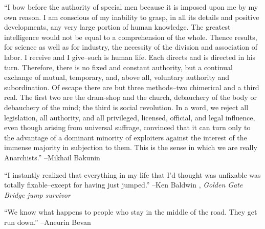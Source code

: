 \documentclass{article}%
\begin{document}
\linebreak%
\vspace{1mm}%
\begin{minipage}{\textwidth}%
\flushleft%
“I bow before the authority of special men because it is imposed upon me by my own reason. I am conscious of my inability to grasp, in all its details and positive developments, any very large portion of human knowledge. The greatest intelligence would not be equal to a comprehension of the whole. Thence results, for science as well as for industry, the necessity of the division and association of labor. I receive and I give–such is human life. Each directs and is directed in his turn. Therefore, there is no fixed and constant authority, but a continual exchange of mutual, temporary, and, above all, voluntary authority and subordination. Of escape there are but three methods–two chimerical and a third real. The first two are the dram{-}shop and the church, debauchery of the body or debauchery of the mind; the third is social revolution. In a word, we reject all legislation, all authority, and all  privileged, licensed, official, and legal influence, even though arising from universal suffrage, convinced that it can turn only to the advantage of a dominant minority of exploiters against the interest of the immense majority in subjection to them.  This is the sense in which we are really Anarchists.”%
\linebreak%
\vspace{1mm}%
–Mikhail Bakunin%
\linebreak%
\vspace{1mm}%
\end{minipage}%
\linebreak%
\vspace{1mm}%
\begin{minipage}{\textwidth}%
\flushleft%
“I instantly realized that everything in my life that I'd thought was unfixable was totally fixable–except for having just jumped.”%
\linebreak%
\vspace{1mm}%
–Ken Baldwin%
, \textit{Golden Gate Bridge jump survivor}%
\linebreak%
\vspace{1mm}%
\end{minipage}%
\linebreak%
\vspace{1mm}%
\begin{minipage}{\textwidth}%
\flushleft%
“We know what happens to people who stay in the middle of the road. They get run down.”%
\linebreak%
\vspace{1mm}%
–Aneurin Bevan%
\linebreak%
\vspace{1mm}%
\end{minipage}%
\end{document}
